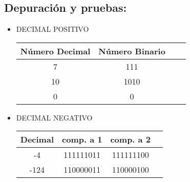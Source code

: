 \subsection{\textbf{Depuración y pruebas:}}

\begin{itemize}
    \item DECIMAL POSITIVO  
    

\begin{center}
    \begin{tabular}{|c|c|c|c|}
    \hline
    \textbf{Número Decimal} & \textbf{Número Binario} \\
    \hline
    7 & 111 \\
    \hline
    10 & 1010 \\
    \hline
    0  & 0  \\
    \hline
    \end{tabular}
\end{center}

  \item DECIMAL NEGATIVO  
\begin{center}
    \newline
    \begin{tabular}{|c|c|c|c|}
    \hline
    \textbf{Decimal} & \textbf{comp. a 1} & \textbf{comp. a 2} \\
    \hline
    -4 & 111111011 & 111111100 \\
    \hline
    -124 & 110000011 & 110000100\\
    \hline
    \end{tabular}
\end{center}
\end{itemize}